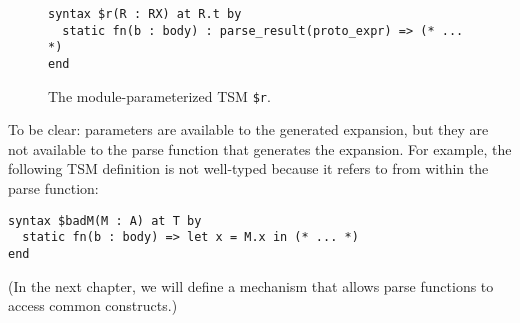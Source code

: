 \begin{figure}[h]
\begin{lstlisting}
syntax $r(R : RX) at R.t by 
  static fn(b : body) : parse_result(proto_expr) => (* ... *)
end
\end{lstlisting}
\vspace{-5px}
\caption{The module-parameterized TSM \texttt{\$r}.}
\label{fig:param-tsm-r}
\end{figure}

To be clear: parameters are available to the generated expansion, but they are not available to the parse function that generates the expansion. For example, the following TSM definition is not well-typed because it refers to  from within the parse function:
\begin{lstlisting}[numbers=none]
syntax $badM(M : A) at T by 
  static fn(b : body) => let x = M.x in (* ... *)
end
\end{lstlisting}
(In the next chapter, we will define a mechanism that allows parse functions to access common constructs.)


